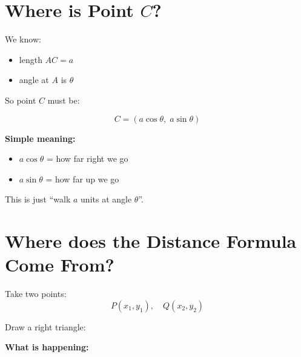\documentclass[11pt]{article}
\begin{document}
\section*{\textcolor{main}{Where is Point $C$?}}

We know:
\begin{itemize}
\item length $AC = a$
\item angle at $A$ is $\theta$
\end{itemize}

So point $C$ must be:

\[
C = (a\cos\theta,\; a\sin\theta)
\]

\begin{tcolorbox}[colback=soft, colframe=accent]
\textbf{Simple meaning:}

\begin{itemize}
\item $a\cos\theta$ = how far right we go
\item $a\sin\theta$ = how far up we go
\end{itemize}

This is just ``walk $a$ units at angle $\theta$''.
\end{tcolorbox}
\section*{\textcolor{main}{Where does the Distance Formula Come From?}}

Take two points:
\[
P(x_1, y_1), \quad Q(x_2, y_2)
\]

Draw a right triangle:

\begin{center}
\end{center}

\textbf{What is happening:}
\end{document}
